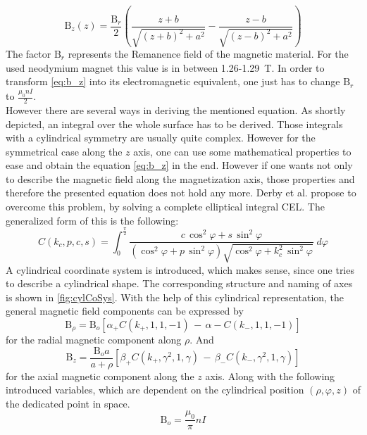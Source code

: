 \begin{equation} \label{eq:b_z}
\mathrm{B}_{z}(z) = \frac{\mathrm{B}_r}{2} \left ( \frac{z + b}{\sqrt{(z + b)^2 + a^2}} - \frac{z - b}{\sqrt{(z - b)^2 + a^2}} \right)
\end{equation}
The factor $ \mathrm{B}_r $ represents the Remanence field of the magnetic material. For the used neodymium magnet this value is in between 1.26-\SI{1.29}{\tesla}. In order to transform \ref{eq:b_z} into its electromagnetic equivalent, one just has to change $ \mathrm{B}_r $ to $ \frac{\mu_{0} n I}{2} $.\\
However there are several ways in deriving the mentioned equation. As shortly depicted, an integral over the whole surface has to be derived. Those integrals with a cylindrical symmetry are usually quite complex. However for the symmetrical case along the $ z $ axis, one can use some mathematical properties to ease and obtain the equation \ref{eq:b_z} in the end. However if one wants not only to describe the magnetic field along the magnetization axis, those properties and therefore the presented equation does not hold any more. Derby et al. propose to overcome this problem, by solving a complete elliptical integral \ac{CEL}. The generalized form of this is the following:
\begin{equation}\label{eq:cel}
C(k_{c},p,c,s) = \int_{0}^{\frac{\pi}{2}} \frac{c \, \cos^{2}\varphi + s \, \sin^{2}\varphi}
{(\cos^{2}\varphi + p \, \sin^{2}\varphi)\sqrt{\cos^{2}\varphi + k_{c}^{2} \, \sin^{2}\varphi}} \; d\varphi
\end{equation}
A cylindrical coordinate system is introduced, which makes sense, since one tries to describe a cylindrical shape. The corresponding structure and naming of axes is shown in \ref{fig:cylCoSys}. With the help of this cylindrical representation, the general magnetic field components can be expressed by
\begin{equation} \label{eq:cylB_rho}
\mathrm{B}_{\rho} = \mathrm{B}_{o}[\alpha_{+} C(k_{+},1,1,-1) \, - \, \alpha{-} C(k_{-},1,1,-1)]
\end{equation}
for the radial magnetic component along $ \rho $. And
\begin{equation} \label{eq:cylB_z}
\mathrm{B}_{z} = \frac{\mathrm{B}_{o}a}{a+\rho}[\beta_{+} C(k_{+},\gamma^2,1,\gamma) \, - \, \beta_{-} C(k_{-},\gamma^2,1,\gamma)]
\end{equation}
for the axial magnetic component along the $ z $ axis. Along with the following introduced variables, which are dependent on the cylindrical position $ (\rho, \varphi, z) $ of the dedicated point in space.
\begin{equation}
\mathrm{B}_{o} = \frac{\mu_{0}}{\pi}nI
\end{equation}

